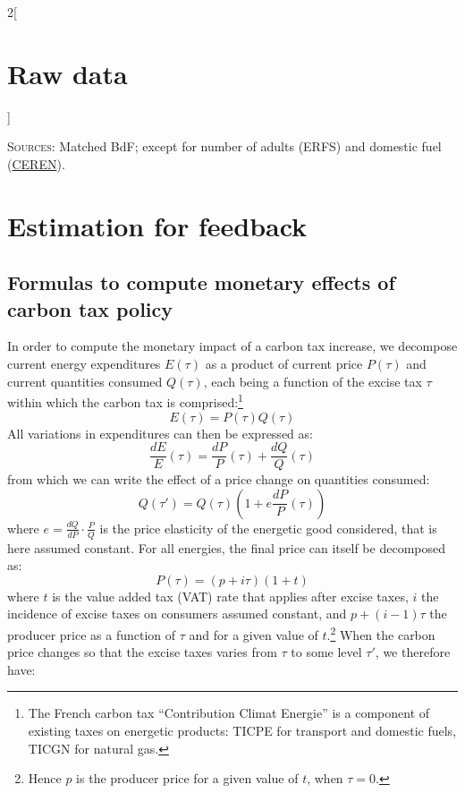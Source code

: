 \documentclass[11pt]{article}
\renewcommand{\arraystretch}{0.73}
\begin{document}
\begin{appendices}
\begin{multicols}{2}[\section{Raw data\label{sec:Raw-Data}}]
\begin{table}[H]
     \footnotesize{\textsc{Sources:} Matched BdF; except for number of adults (ERFS) and domestic fuel (\href{https://www.lesechos.fr/industrie-services/energie-environnement/le-chauffage-au-fioul-devient-de-plus-en-plus-cher-147372}{CEREN}).} %
\end{table}

\end{multicols}
\renewcommand{\arraystretch}{0.73}

\section{Estimation for feedback \label{subsec:app_estimation_feedback}}

    \subsection{Formulas to compute monetary effects of carbon tax policy \label{appendix:formulas}}

In order to compute the monetary impact of a carbon tax increase, we decompose current energy expenditures $E(\tau)$ as a product of current price $P(\tau)$ and current quantities consumed $Q(\tau)$, each being a function of the excise tax $\tau$ within which the carbon tax is comprised:\footnote{The French carbon tax ``Contribution Climat Energie'' is a component of existing taxes on energetic products: TICPE for transport and domestic fuels, TICGN for natural gas.}
$$
E\left( \tau \right) = P\left( \tau \right) Q\left(\tau\right)
$$
\noindent
All variations in expenditures can then be expressed as:
$$
\frac{dE}{E}\left(\tau\right) = \frac{dP}{P}\left(\tau\right) + \frac{dQ}{Q}\left(\tau\right)
$$
\noindent
from which we can write the effect of a price change on quantities consumed:
$$
Q\left(\tau '\right) = Q\left(\tau\right) \left(1 + e\frac{dP}{P}\left(\tau\right)\right)
$$
\noindent
where $e = \frac{dQ}{dP} \cdot \frac{P}{Q}$ is the price elasticity of the energetic good considered, that is here assumed constant. For all energies, the final price can itself be decomposed as:
$$
P\left(\tau\right) = \left(p+i\tau\right)\left(1+t\right)
$$
\noindent
where $t$ is the value added tax (VAT) rate that applies after excise taxes, $i$ the incidence of excise taxes on consumers assumed constant, and $p + \left(i-1\right)\tau$ the producer price as a function of $\tau$ and for a given value of $t$.\footnote{Hence $p$ is the producer price for a given value of $t$, when $\tau = 0$.} When the carbon price changes so that the excise taxes varies from $\tau$ to some level $\tau'$, we therefore have: 


\end{appendices}
\end{document}

